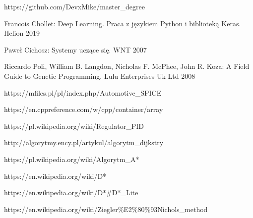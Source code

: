 \documentclass[12pt,twoside]{article}
\begin{document}
\begin{thebibliography}{12}
 https://github.com/DevxMike/master\_degree

 Francois Chollet: Deep Learning. Praca z językiem Python i biblioteką Keras. Helion 2019

 Paweł Cichosz: Systemy uczące się. WNT 2007 

  Riccardo Poli, William B. Langdon, Nicholas F. McPhee, John R. Koza: A Field Guide to Genetic Programming. Lulu Enterprises Uk Ltd 2008

 https://mfiles.pl/pl/index.php/Automotive\_SPICE

 https://en.cppreference.com/w/cpp/container/array

 https://pl.wikipedia.org/wiki/Regulator\_PID

 http://algorytmy.ency.pl/artykul/algorytm\_dijkstry

 https://pl.wikipedia.org/wiki/Algorytm\_A*

 https://en.wikipedia.org/wiki/D*

 https://en.wikipedia.org/wiki/D*\#D*\_Lite

 https://en.wikipedia.org/wiki/Ziegler\%E2\%80\%93Nichols\_method

\end{thebibliography}

\clearpage

\makesummary
\end{document}
